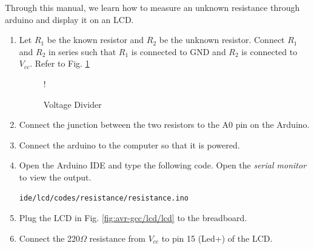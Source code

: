 Through this manual, we learn how to measure an unknown resistance through arduino and display it on an LCD.
\begin{enumerate}[label=\arabic*.,ref=\theenumi]
%
\item
Let $R_1$ be the known resistor and $R_2$ be the unknown resistor.  Connect $R_1$ and $R_2$ in series such that $R_1$ is connected
to GND and $R_2$ is connected to $V_{cc}$. Refer to Fig. \ref{fig:voltage_divider}

%
%
		\begin{figure}[!htb]
\centering
{} {!} {

}
\caption{Voltage Divider}
\label{fig:voltage_divider}
\end{figure}
%

\item
Connect the junction between the two resistors to  the A0 pin on the Arduino.

%
\item
Connect the arduino to the computer so that it is powered.

%
\item
Open the Arduino IDE and type the following code.  Open the {\em serial monitor} to view the output.

%
		\begin{lstlisting}
ide/lcd/codes/resistance/resistance.ino
		\end{lstlisting}
%
\item Plug the LCD in Fig. \ref{fig:avr-gcc/lcd/lcd} to the breadboard.

%
\item
Connect the 220$\Omega$ resistance from $V_{cc}$ to pin 15 (Led+) of the LCD.


\end{enumerate}
